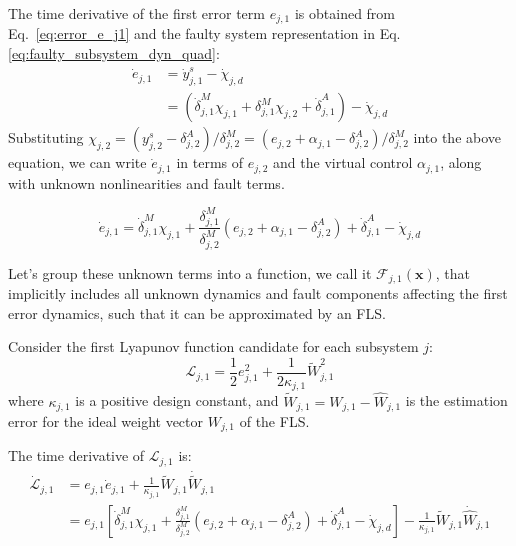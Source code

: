 The time derivative of the first error term $e_{j,1}$ is obtained from Eq.~\eqref{eq:error_e_j1} and the faulty system representation in Eq. \eqref{eq:faulty_subsystem_dyn_quad}:
\begin{align}
    \dot{e}_{j,1} &= \dot{y}_{j,1}^s - \dot{\chi}_{j,d} \nonumber \\
    &= \left( \dot{\delta}_{j,1}^M \chi_{j,1} + \delta_{j,1}^M \chi_{j,2} + \dot{\delta}_{j,1}^A \right) - \dot{\chi}_{j,d} \label{eq:e_j1_dot_raw}
\end{align}
Substituting $\chi_{j,2} = (y_{j,2}^s - \delta_{j,2}^A) / \delta_{j,2}^M = (e_{j,2} + \alpha_{j,1} - \delta_{j,2}^A) / \delta_{j,2}^M$ into the above equation, we can write $\dot{e}_{j,1}$ in terms of $e_{j,2}$ and the virtual control $\alpha_{j,1}$, along with unknown nonlinearities and fault terms. 

\begin{equation}
    \dot{e}_{j,1} = \dot{\delta}_{j,1}^M \chi_{j,1} + \frac{\delta_{j,1}^M}{\delta_{j,2}^M}  (e_{j,2} + \alpha_{j,1} - \delta_{j,2}^A)  + \dot{\delta}_{j,1}^A - \dot{\chi}_{j,d}
\end{equation}


Let's group these unknown terms into a function, we call it $\mathcal{F}_{j,1}(\mathbf{x})$, that  implicitly includes all unknown dynamics and fault components affecting the first error dynamics, such that it can be approximated by an FLS.

Consider the first Lyapunov function candidate for each subsystem $j$:
\begin{equation}
    \mathcal{L}_{j,1} = \frac{1}{2} e_{j,1}^2 + \frac{1}{2\kappa_{j,1}} \tilde{W}_{j,1}^2 \label{eq:lyapunov_Vj1}
\end{equation}
where $\kappa_{j,1}$ is a positive design constant, and $\tilde{W}_{j,1} = W_{j,1} - \hat{W}_{j,1}$ is the estimation error for the ideal weight vector $W_{j,1}$ of the FLS.

The time derivative of $\mathcal{L}_{j,1}$ is:
\begin{align}
    \dot{\mathcal{L}}_{j,1} &= e_{j,1} \dot{e}_{j,1} + \frac{1}{\kappa_{j,1}} \tilde{W}_{j,1} \dot{\tilde{W}}_{j,1} \nonumber \\
    &= e_{j,1} \left[ \dot{\delta}_{j,1}^M \chi_{j,1} + \frac{\delta_{j,1}^M}{\delta_{j,2}^M}  (e_{j,2} + \alpha_{j,1} - \delta_{j,2}^A)  + \dot{\delta}_{j,1}^A - \dot{\chi}_{j,d} \right] - \frac{1}{\kappa_{j,1}} \tilde{W}_{j,1} \dot{\hat{W}}_{j,1} \label{eq:Vj1_dot_expanded}
\end{align}

